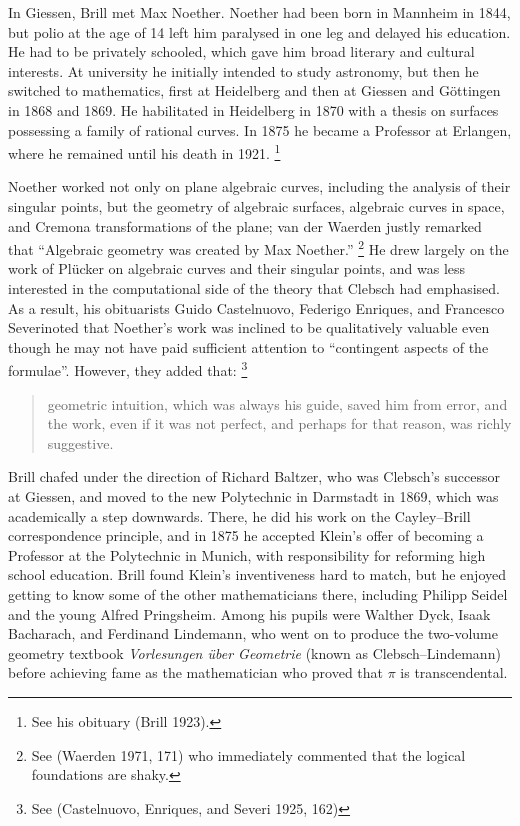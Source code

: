 In Giessen, Brill met Max Noether. Noether had been born in Mannheim
in 1844, but polio at the age of 14 left him paralysed in one leg and
delayed his education. He had to be privately schooled, which gave
him  broad literary and cultural interests. At university he  initially
intended to study astronomy, but then he switched to mathematics, first
at Heidelberg and then at Giessen and G\"ottingen in 1868 and 1869. He
habilitated in Heidelberg in 1870 with a thesis on surfaces possessing
a family of rational curves. In 1875 he became a Professor at Erlangen,
where he remained until his death in 1921.%
%
\footnote{See his obituary
(Brill 1923).}


Noether  worked not only on plane algebraic curves, including the analysis
of their singular points, but the geometry of algebraic surfaces,
algebraic curves in space, and Cremona transformations of the plane;
van der Waerden justly remarked that ``Algebraic geometry was created by
Max Noether.''%
%
\footnote{See (Waerden 1971, 171) who immediately commented
that the logical foundations are shaky.}
%
He drew largely on the work of Pl\"ucker on algebraic curves and their
singular points, and was less interested in the computational side of the
theory that Clebsch had emphasised. As a result, his obituarists\emdash
Guido Castelnuovo, Federigo Enriques, and Francesco Severi\emdash noted
that Noether's work was inclined to be qualitatively valuable even though
he may not have paid sufficient attention to ``contingent aspects of
the formulae''.  However, they added that:%
%
\footnote{See (Castelnuovo,
Enriques, and Severi 1925, 162)}
%
\begin{quote}
geometric intuition, which was always his guide, saved him from error,
and the work, even if it was not perfect, and perhaps for that reason,
was richly suggestive.
\end{quote}



Brill  chafed under the direction of  Richard Baltzer, who was Clebsch's
successor at Giessen,  and moved to the new Polytechnic in Darmstadt
in 1869, which was academically a step downwards. There, he did his
work on the Cayley--Brill correspondence principle, and in 1875  he
accepted Klein's offer of becoming a Professor at the Polytechnic
in Munich, with responsibility for reforming high school education.
Brill found Klein's inventiveness hard to match, but he enjoyed getting
to know some of the other mathematicians there, including Philipp Seidel
and the young Alfred Pringsheim. Among his pupils were Walther Dyck,
Isaak Bacharach, and Ferdinand Lindemann, who went on to produce the
two-volume geometry textbook \emph{Vorlesungen \"uber Geometrie} (known
as Clebsch--Lindemann) before achieving fame as the mathematician who
proved that $\pi$ is transcendental.


